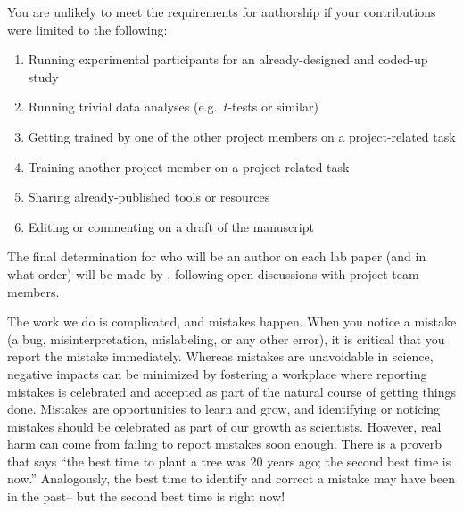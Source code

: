\documentclass{tufte-book} %
\begin{document}

\noindent You are unlikely to meet the requirements for authorship if your
contributions were limited to the following:
\begin{enumerate}
 \item Running experimental participants for an already-designed and  coded-up study
 \item Running trivial data analyses (e.g.\ $t$-tests or similar)
 \item Getting trained by one of the other project members on a  project-related task
 \item Training another project member on a project-related task
 \item Sharing already-published tools or resources
 \item Editing or commenting on a draft of the manuscript
\end{enumerate}

\noindent The final determination for who will be an author on each lab paper (and in what order) will be made by \director, following open discussions with project team members.


\noindent The work we do is complicated, and mistakes happen. When you notice a mistake (a bug, misinterpretation, mislabeling, or any other error), it is critical that you report the mistake immediately. Whereas mistakes are unavoidable in science, negative impacts can be minimized by fostering a workplace where reporting mistakes is celebrated and accepted as part of the natural course of getting things done. Mistakes are opportunities to learn and grow, and identifying or noticing mistakes should be celebrated as part of our growth as scientists. However, real harm can come from failing to report mistakes soon enough. There is a proverb that says ``the best time to plant a tree was 20 years ago; the second best time is now.'' Analogously, the best time to identify and correct a mistake may have been in the past-- but the second best time is right now!

~\\
\end{document}
